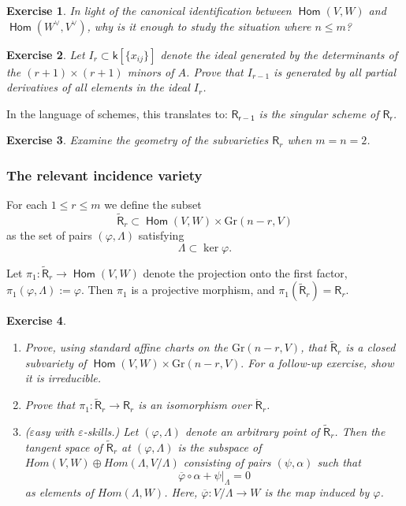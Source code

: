 \documentclass[11pt]{article}
\newcommand{\Gr}{\textrm{Gr}}
\renewcommand{\k}{\mathsf{k}}
\renewcommand{\to}{\longrightarrow}
\DeclareMathOperator{\Hom}{\mathsf{Hom}}
\renewcommand{\k}{\mathsf{k}}
\DeclareMathOperator{\Gr}{Gr}
\renewcommand{\to}{{\longrightarrow}}
\newtheorem{exercise}{Exercise}[section]
\begin{document}
\begin{exercise}
In light of the canonical identification between \(\Hom(V,W)\) and \(\Hom(W^{\vee},V^{\vee})\), why is it enough to study the situation where \(n \leq m\)?
\end{exercise}


\begin{exercise}
Let \(I_{r} \subset \k[\{ x_{ij}\}]\) denote the ideal generated by the determinants of the \((r+1) \times (r+1)\) minors of \(A\).  Prove that \(I_{r-1}\) is generated by all partial derivatives of all elements in the ideal \(I_{r}\).
\end{exercise}


In the language of schemes, this translates to: \emph{\(\mathsf{R_{r-1}}\) is
the singular scheme of \(\mathsf{R_{r}}\).}






\begin{exercise}
Examine the geometry of the subvarieties \(\mathsf{R}_{r}\) when \(m=n=2\).
\end{exercise}

\subsubsection{The relevant incidence variety}
\label{sec:org2ce1f54}
For each \(1 \leq r \leq m\) we define the subset 
\[\widetilde{\mathsf{R}}_{r} \subset \Hom(V,W) \times \Gr(n-r,V)\] as the set of pairs \((\varphi, \Lambda)\)  satisfying  \[ \Lambda \subset \ker \varphi.\]


Let \(\pi_{1}: \widetilde{\mathsf{R}}_{r} \to \Hom(V,W)\) denote the projection onto the first factor, \(\pi_{1}(\varphi, \Lambda) := \varphi\).  Then \(\pi_{1}\) is a projective morphism, and \(\pi_{1}(\widetilde{\mathsf{R}}_{r}) = \mathsf{R}_{r}\).


\begin{exercise}
\begin{enumerate}
\item Prove, using standard affine charts on the \(\Gr(n-r,V)\), that \(\widetilde{\mathsf{R}}_{r}\) is a closed subvariety of \(\Hom(V,W) \times \Gr(n-r,V).\)  For a follow-up exercise, show it is irreducible.
\item Prove that \(\pi_{1}: \widetilde{\mathsf{R}}_{r} \to \mathsf{R}_{r}\) is an isomorphism over \(\mathring{\mathsf{R}}_{r}\).
\item (\(\varepsilon\)asy  with \(\varepsilon\)-skills.) Let \((\varphi, \Lambda)\) denote an arbitrary point of \(\widetilde{\mathsf{R}}_{r}\). Then the tangent space of \(\widetilde{\mathsf{R}}_{r}\) at \((\varphi, \Lambda)\) is the subspace of   \(Hom(V,W) \oplus Hom(\Lambda, V/\Lambda)\) consisting of pairs \((\psi,\alpha)\) such that \[\overline{\varphi} \circ \alpha + \psi|_{\Lambda} = 0\] as elements of \(Hom(\Lambda, W)\).  Here, \(\overline{\varphi}: V /\Lambda \to W\) is the map induced by \(\varphi\).
\end{enumerate}
\end{exercise}
\end{document}
